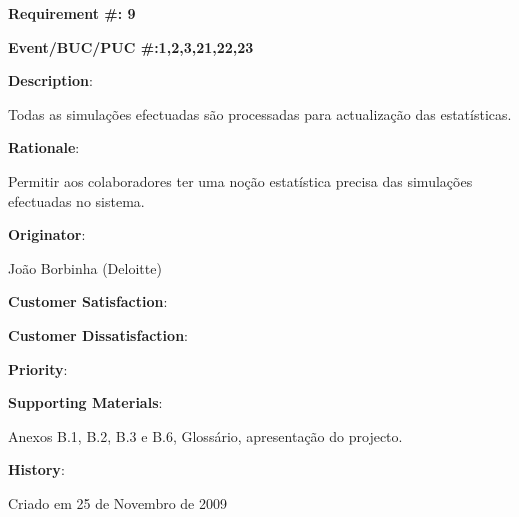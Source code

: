 \pagebreak

\begin{minipage}{0.55\textwidth}
\begin{flushleft}\textbf{Requirement \#: 9}\end{flushleft}
\end{minipage}
\begin{minipage}{0.4\textwidth}
\begin{flushright}\textbf{Event/BUC/PUC \#:1,2,3,21,22,23}\end{flushright}
\end{minipage}

\begin{description}
\item \textbf{Description}:

Todas as simulações efectuadas são processadas para actualização das estatísticas.\\

\item \textbf{Rationale}:

Permitir aos colaboradores ter uma noção estatística precisa das simulações efectuadas no sistema.\\

\item \textbf{Originator}:

João Borbinha (Deloitte)\\

\begin{minipage}{0.45\textwidth}
\begin{flushleft}\item \textbf{Customer Satisfaction}:\end{flushleft}
\end{minipage}
\begin{minipage}{0.45\textwidth}
\begin{flushleft}\item \textbf{Customer Dissatisfaction}:\end{flushleft}
\end{minipage}

\item \textbf{Priority}:\\

\item \textbf{Supporting Materials}:

Anexos B.1, B.2, B.3 e B.6, Glossário, apresentação do projecto.\\

\item \textbf{History}:

Criado em 25 de Novembro de 2009\\
\end{description}

